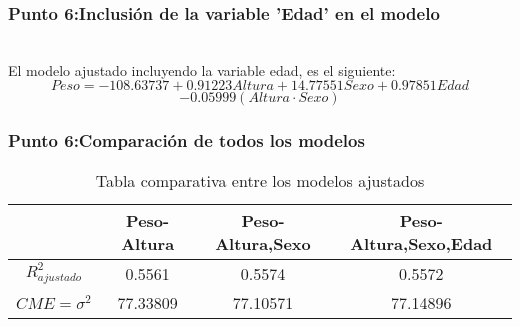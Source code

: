 \documentclass[12pt]{beamer}
\begin{document}
\begin{frame}
\frametitle{Punto 6:Inclusión de la variable 'Edad' en el modelo}
~\\ El modelo ajustado incluyendo la variable edad, es el siguiente:
~\\ $$Peso=-108.63737+0.91223 Altura+14.77551 Sexo+0.97851 Edad$$
$$-0.05999(Altura\cdot Sexo)$$
\end{frame}

\begin{frame}
\frametitle{Punto 6:Comparación de todos los modelos}
\begin{table}[!htb]
\centering
\caption{Tabla comparativa entre los modelos ajustados}\label{Tabla1}
\resizebox{12cm}{!} {
\begin{tabular}{cccc}
\hline
 &Peso-Altura&Peso-Altura,Sexo&Peso-Altura,Sexo,Edad \\ 
\hline
$R^2_{ajustado}$ &0.5561&0.5574&0.5572 \\ 
 
$CME=\sigma^2$ &77.33809&77.10571&77.14896 \\ 
\hline 
\end{tabular}
}
\end{table}
\end{frame}
\end{document}
